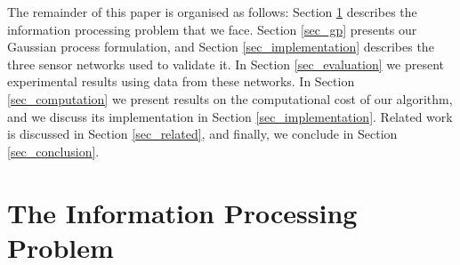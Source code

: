 \documentclass{acmsmall}
\begin{document}
The remainder of this paper is organised as follows: Section \ref{sec_info} describes the information processing problem that we face. Section \ref{sec_gp} presents our Gaussian process formulation, and Section \ref{sec_implementation} describes the three sensor networks used to validate it. In Section \ref{sec_evaluation} we present experimental results using data from these networks. In Section \ref{sec_computation} we present results on the computational cost of our algorithm, and we discuss its implementation in Section \ref{sec_implementation}. Related work is discussed in Section \ref{sec_related}, and finally, we conclude in Section \ref{sec_conclusion}.

\section{The Information Processing Problem}\label{sec_info}
\end{document}
